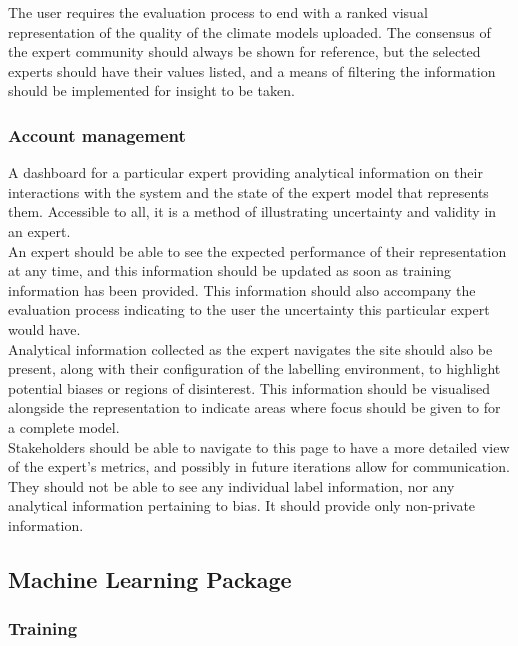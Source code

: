 \documentclass{ecmm427_assignment}
\begin{document}
\quad The user requires the evaluation process to end with a ranked visual representation of the quality of the climate models uploaded. The consensus of the expert community should always be shown for reference, but the selected experts should have their values listed, and a means of filtering the information should be implemented for insight to be taken.

\subsubsection{Account management}

\quad A dashboard for a particular expert providing analytical information on their interactions with the system and the state of the expert model that represents them. Accessible to all, it is a method of illustrating uncertainty and validity in an expert.\\

\quad An expert should be able to see the expected performance of their representation at any time, and this information should be updated as soon as training information has been provided. This information should also accompany the evaluation process indicating to the user the uncertainty this particular expert would have.\\

\quad Analytical information collected as the expert navigates the site should also be present, along with their configuration of the labelling environment, to highlight potential biases or regions of disinterest. This information should be visualised alongside the representation to indicate areas where focus should be given to for a complete model.\\

\quad Stakeholders should be able to navigate to this page to have a more detailed view of the expert's metrics, and possibly in future iterations allow for communication. They should not be able to see any individual label information, nor any analytical information pertaining to bias. It should provide only non-private information.

\subsection{Machine Learning Package}
\subsubsection{Training}
\end{document}
